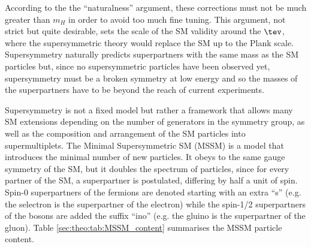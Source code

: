 \noindent According to the the ``naturalness'' argument, these corrections must not be much greater than $m_{H}$ in order to avoid too much fine tuning. This argument, not strict but quite desirable, sets the scale of the SM validity around the $\tev$, where the supersymmetric theory would replace the SM up to the Plank scale. Supersymmetry naturally predicts superpartners with the  same mass as the SM particles but, since no supersymmetric particles have been observed yet, supersymmetry must be a broken symmetry at low energy \cite{Martin:1997ns,Witten:1981nf} and so the masses of the superpartners have to be beyond the reach of current experiments.\par
Supersymmetry is not a fixed model but rather a framework that allows many SM extensions depending on the number of generators in the symmetry group, as well as the composition and arrangement of the SM particles into supermultiplets. The Minimal Supersymmetric SM (MSSM) is a model that introduces the minimal number of new particles. It obeys to the same gauge symmetry of the SM, but it doubles the spectrum of particles, since for every partner of the SM, a superpartner is postulated, differing by half a unit of spin. Spin-0 superpartners of the fermions are denoted starting with an extra ``s'' (e.g. the selectron is the superpartner of the electron) while the spin-1/2 superpartners of the bosons are added the suffix ``ino'' (e.g. the gluino is the superpartner of the gluon). Table \ref{sec:theo:tab:MSSM_content} summarises the MSSM particle content. 


